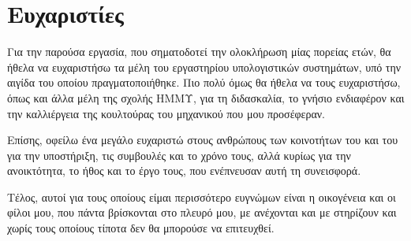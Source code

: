 \chapter*{Ευχαριστίες}

Για την παρούσα εργασία, που σηματοδοτεί την ολοκλήρωση μίας πορείας ετών, θα
ήθελα να ευχαριστήσω τα μέλη του εργαστηρίου υπολογιστικών συστημάτων, υπό την
αιγίδα του οποίου πραγματοποιήθηκε. Πιο πολύ όμως θα ήθελα να τους ευχαριστήσω,
όπως και άλλα μέλη της σχολής ΗΜΜΥ, για τη διδασκαλία, το γνήσιο ενδιαφέρον και
την καλλιέργεια της κουλτούρας του μηχανικού που μου προσέφεραν.

Επίσης, οφείλω ένα μεγάλο ευχαριστώ στους ανθρώπους των κοινοτήτων του \osv{}
και του \viofs{} για την υποστήριξη, τις συμβουλές και το χρόνο τους, αλλά
κυρίως για την ανοικτότητα, το ήθος και το έργο τους, που ενέπνευσαν αυτή τη
συνεισφορά.

Τέλος, αυτοί για τους οποίους είμαι περισσότερο ευγνώμων είναι η οικογένεια και
οι φίλοι μου, που πάντα βρίσκονται στο πλευρό μου, με ανέχονται και με στηρίζουν
και χωρίς τους οποίους τίποτα δεν θα μπορούσε να επιτευχθεί.
